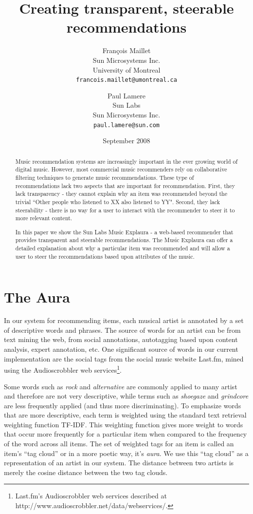 \documentclass[a4paper,9pt,twocolumn]{article}
\title{Creating transparent, steerable recommendations}
\author{
Fran\c{c}ois Maillet\\
Sun Microsystems Inc.\\
University of Montreal\\
\texttt{francois.maillet@umontreal.ca}
\and 
Paul Lamere \\
Sun Labs\\
Sun Microsystems Inc.\\
\texttt{paul.lamere@sun.com}
}
\date{September 2008}
\begin{document}
\maketitle

\begin{abstract}

Music recommendation systems are increasingly important in the ever 
    growing world of digital music.  However, most commercial music 
    recommenders rely on collaborative filtering techniques to generate 
    music recommendations. These type of recommendations lack two aspects 
    that are important for recommendation.  First, they lack transparency 
    - they cannot explain why an item was recommended beyond the trivial 
    ``Other people who listened to XX also listened to YY". Second, they 
    lack steerability - there is no way for a user to interact with the 
    recommender to steer it to more relevant content.
    
    In this paper we show the Sun Labs Music Explaura - a 
    web-based recommender that provides transparent and steerable 
    recommendations. The Music Explaura can offer a detailed explanation 
    about why a particular item was recommended and will allow a user to 
    steer the recommendations based upon attributes of the music.

\end{abstract}

\section{The Aura}

In our system for recommending items, each musical artist is annotated
by a set of descriptive words and phrases.  The source
of words for an artist can be from text mining the web, from social
annotations, autotagging based upon content analysis, expert
annotation, etc.  One significant source of words in our current
implementation are the social tags from the social music website
Last.fm, mined using the Audioscrobbler web services\footnote{Last.fm's
Audioscrobbler web services described at
http://www.audioscrobbler.net/data/webservices/.}.

Some words such as \textit{rock} and \textit{alternative} are
commonly applied to many artist and therefore are not very descriptive,
while terms such as \textit{shoegaze} and \textit{grindcore} are
less frequently applied (and thus more discriminating).  To emphasize
words that are more descriptive, each term is weighted using the
standard text retrieval weighting function TF-IDF\cite{tfidf}. This
weighting function gives more weight to words that occur more
frequently for a particular item when compared to the frequency of
the word across all items.  The set of weighted tags for an item
is called an item's ``tag cloud'' or in a more poetic way, it's
\textit{aura}.  We use this ``tag cloud'' as a representation of
an artist in our system. The distance between two artists is merely
the cosine distance between the two tag clouds\cite{cosine}.
\end{document}
